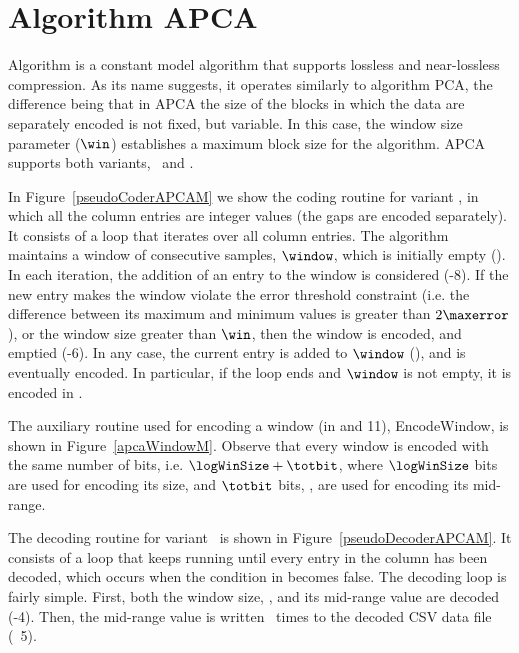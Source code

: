 
\clearpage

\section{Algorithm APCA}
\label{algo:apca}


Algorithm \textit{\APCAfull} \cite{coder:apca} is a constant model algorithm that supports lossless and near-lossless compression. As its name suggests, it operates similarly to algorithm PCA, the difference being that in APCA the size of the blocks in which the data are separately encoded is not fixed, but variable. In this case, the window size parameter ($\win$) establishes a maximum block size for the algorithm. APCA supports both variants, \maskalgo\ and \NOmaskalgo.


In Figure~\ref{pseudoCoderAPCAM} we show the coding routine for variant \maskalgo, in which all the column entries are integer values (the gaps are encoded separately). It consists of a loop that iterates over all column entries. The algorithm maintains a window of consecutive samples, $\window$, which is initially empty (). In each iteration, the addition of an entry to the window is considered (-8). If the new entry makes the window violate the error threshold constraint (i.e. the difference between its maximum and minimum values is greater than $2\maxerror$), or the window size greater than $\win$, then the window is encoded, and emptied (-6). In any case, the current entry is added to $\window$ (), and is eventually encoded. In particular, if the loop ends and $\window$ is not empty, it is encoded in . 





\vspace{+2pt}
The auxiliary routine used for encoding a window (in  and 11), EncodeWindow, is shown in Figure~\ref{apcaWindowM}. Observe that every window is encoded with the same number of bits, i.e. $\logWinSize +\totbit$, where $\logWinSize$ bits are used for encoding its size, and $\totbit$ bits, \wheretotbit, are used for encoding its mid-range.
\vspace{+3pt}





\clearpage


The decoding routine for variant \maskalgo\ is shown in Figure~\ref{pseudoDecoderAPCAM}. It consists of a loop that keeps running until every entry in the column has been decoded, which occurs when the condition in  becomes false. The decoding loop is fairly simple. First, both the window size, \sizee, and its mid-range value are decoded (-4). Then, the mid-range value is written \sizee\ times to the decoded CSV data file (\Line~5).


